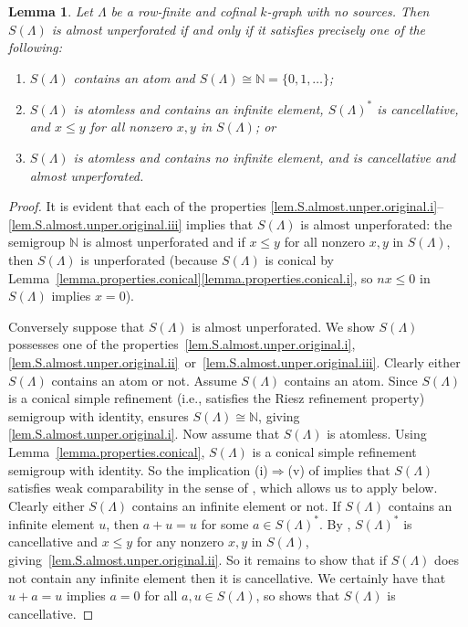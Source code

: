 \documentclass[a4paper, 12pt]{amsart}
\numberwithin{equation}{section}
\newcounter{theorem}
\newtheorem{lemma}[theorem]{Lemma}
\theoremstyle{remark}
\theoremstyle{definition}
\begin{document}
\begin{lemma}\label{lem.S.almost.unper.original}
Let $\Lambda$ be a row-finite and cofinal $k$-graph with no sources. Then $S(\Lambda)$ is
almost unperforated if and only if it satisfies precisely one of the following:
\begin{enumerate}
\item\label{lem.S.almost.unper.original.i} $S(\Lambda)$ contains an atom and $S(\Lambda)\cong{\mathbb{N}}=\{0, 1, \dots\}$;
\item\label{lem.S.almost.unper.original.ii} $S(\Lambda)$ is atomless and contains an infinite element, $S(\Lambda)^*$
    is cancellative, and $x \leq y$ for all nonzero $x, y$ in $S(\Lambda)$; or
\item\label{lem.S.almost.unper.original.iii} $S(\Lambda)$ is atomless and contains no infinite element, and is cancellative
    and almost unperforated.
\end{enumerate}
\end{lemma}
\begin{proof}
It is evident that each of the properties \eqref{lem.S.almost.unper.original.i}--\eqref{lem.S.almost.unper.original.iii} implies that $S(\Lambda)$ is almost
unperforated: the semigroup ${\mathbb{N}}$ is almost unperforated and if $x \leq y$ for all
nonzero $x, y$ in $S(\Lambda)$, then $S(\Lambda)$ is unperforated (because $S(\Lambda)$
is conical by Lemma~\ref{lemma.properties.conical}\eqref{lemma.properties.conical.i}, so $nx\leq 0$ in $S(\Lambda)$
implies $x=0$).

Conversely suppose that $S(\Lambda)$ is almost unperforated. We show $S(\Lambda)$
possesses one of the properties~\eqref{lem.S.almost.unper.original.i}, \eqref{lem.S.almost.unper.original.ii}~or~\eqref{lem.S.almost.unper.original.iii}. Clearly either $S(\Lambda)$ contains an
atom or not. Assume $S(\Lambda)$ contains an atom. Since $S(\Lambda)$ is a conical simple
refinement (i.e., satisfies the Riesz refinement property) semigroup with identity,
\cite[Corollary~2.7]{MR2806681} ensures $S(\Lambda)\cong{\mathbb{N}}$, giving \eqref{lem.S.almost.unper.original.i}. Now assume that
$S(\Lambda)$ is atomless. Using Lemma~\ref{lemma.properties.conical}, $S(\Lambda)$ is a
conical simple refinement semigroup with identity. So the implication (i)$\Rightarrow$(v) of
\cite[Proposition~3.8]{MR2806681} implies that $S(\Lambda)$ satisfies weak comparability
in the sense of \cite{MR1301484}, which allows us to apply \cite[Proposition~1.4(b) and Corollary~1.8]{MR1301484} below. Clearly either $S(\Lambda)$ contains an infinite
element or not. If $S(\Lambda)$ contains an infinite element $u$, then $a + u = u$ for
some $a\in S(\Lambda)^*$. By \cite[Proposition~1.4(b)]{MR1301484}, $S(\Lambda)^*$ is
cancellative and $x \leq y$ for any nonzero $x, y$ in $S(\Lambda)$, giving~\eqref{lem.S.almost.unper.original.ii}. So it
remains to show that if $S(\Lambda)$ does not contain any infinite element then it is
cancellative. We certainly have that $u + a = u$ implies $a = 0$ for all $a,u\in
S(\Lambda)$, so \cite[Corollary 1.8]{MR1301484} shows that $S(\Lambda)$ is cancellative.
\end{proof}
\end{document}
